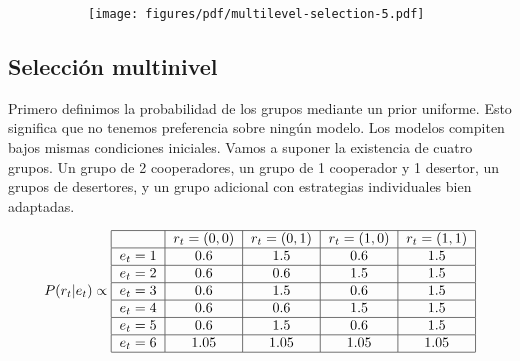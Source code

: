 \documentclass[a4paper,10pt]{article}
\begin{document}
\begin{figure}[H]
    \centering
    \begin{subfigure}[b]{0.66\textwidth}
    \texttt{[image: figures/pdf/multilevel-selection-5.pdf]}
    \end{subfigure}
    \caption{
    }
    \label{fig:multilevel-selection-5}
\end{figure}




\subsection{Selección multinivel}

Primero definimos la probabilidad de los grupos mediante un prior uniforme.
Esto significa que no tenemos preferencia sobre ningún modelo.
Los modelos compiten bajos mismas condiciones iniciales.
Vamos a suponer la existencia de cuatro grupos.
Un grupo de 2 cooperadores, un grupo de 1 cooperador y 1 desertor, un grupos de desertores, y un grupo adicional con estrategias individuales bien adaptadas.

\begin{align}
\centering
P(r_{t}|e_{t}) \propto \begin{tabular}{|c|c|c|c|c|c|c|}
        \hline
        & $r_t=(0,0)$ & $r_t=(0,1)$ & $r_t=(1,0)$ &  $r_t=(1,1)$  \\ \hline
       $e_{t}=1$ & $0.6$ & $1.5$ & $0.6$ & $1.5$ \\ \hline
       $e_{t}=2$ & $0.6$ & $0.6$ & $1.5$ & $1.5$  \\ \hline
       $e_{t}=3$ & $0.6$ & $1.5$ & $0.6$ & $1.5$  \\ \hline
       $e_{t}=4$ & $0.6$ & $0.6$ & $1.5$ & $1.5$ \\ \hline
       $e_{t}=5$ & $0.6$ & $1.5$ & $0.6$ & $1.5$ \\ \hline
       $e_{t}=6$ & $1.05$ & $1.05$ & $1.05$ & $1.05$  \\ \hline
\end{tabular}
\end{align}
\end{document}
